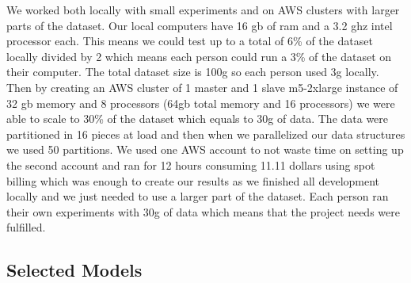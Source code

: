 We worked both locally with small experiments and on AWS clusters with larger parts of the dataset. Our local computers have 16 gb of ram and a 3.2 ghz intel processor each. This means we could test up to a total of 6\% of the dataset locally divided by 2 which means each person could run a 3\% of the dataset on their computer. The total dataset size is 100g so each person used 3g locally. Then by creating an AWS cluster of 1 master and 1 slave m5-2xlarge instance of 32 gb memory and 8 processors (64gb total memory and 16 processors) we were able to scale to 30\% of the dataset which equals to 30g of data. The data were partitioned in 16 pieces at load and then when we parallelized our data structures we used 50 partitions. We used one AWS account to not waste time on setting up the second account and ran for 12 hours consuming 11.11 dollars using spot billing which was enough to create our results as we finished all development locally and we just needed to use a larger part of the dataset. Each person ran their own experiments with 30g of data which means that the project needs were fulfilled.


\subsection{Selected Models}

